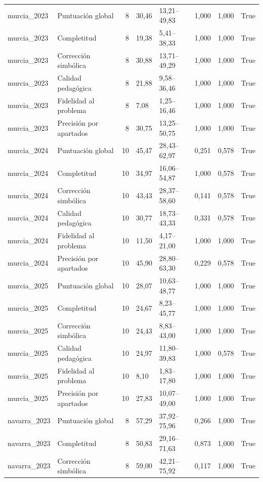 \begin{tabular}{llrllllr}
murcia\_2023 & Puntuación global & 8 & 30,46 & 13,21–49,83 & 1,000 & 1,000 & True \\
murcia\_2023 & Completitud & 8 & 19,38 & 5,41–38,33 & 1,000 & 1,000 & True \\
murcia\_2023 & Corrección simbólica & 8 & 30,88 & 13,71–49,29 & 1,000 & 1,000 & True \\
murcia\_2023 & Calidad pedagógica & 8 & 21,88 & 9,58–36,46 & 1,000 & 1,000 & True \\
murcia\_2023 & Fidelidad al problema & 8 & 7,08 & 1,25–16,46 & 1,000 & 1,000 & True \\
murcia\_2023 & Precisión por apartados & 8 & 30,75 & 13,25–50,75 & 1,000 & 1,000 & True \\
murcia\_2024 & Puntuación global & 10 & 45,47 & 28,43–62,97 & 0,251 & 0,578 & True \\
murcia\_2024 & Completitud & 10 & 34,97 & 16,06–54,87 & 1,000 & 0,578 & True \\
murcia\_2024 & Corrección simbólica & 10 & 43,43 & 28,37–58,60 & 0,141 & 0,578 & True \\
murcia\_2024 & Calidad pedagógica & 10 & 30,77 & 18,73–43,33 & 0,331 & 0,578 & True \\
murcia\_2024 & Fidelidad al problema & 10 & 11,50 & 4,17–21,00 & 1,000 & 1,000 & True \\
murcia\_2024 & Precisión por apartados & 10 & 45,90 & 28,80–63,30 & 0,229 & 0,578 & True \\
murcia\_2025 & Puntuación global & 10 & 28,07 & 10,63–48,77 & 1,000 & 1,000 & True \\
murcia\_2025 & Completitud & 10 & 24,67 & 8,23–45,77 & 1,000 & 1,000 & True \\
murcia\_2025 & Corrección simbólica & 10 & 24,43 & 8,83–43,00 & 1,000 & 1,000 & True \\
murcia\_2025 & Calidad pedagógica & 10 & 24,97 & 11,80–39,83 & 1,000 & 0,578 & True \\
murcia\_2025 & Fidelidad al problema & 10 & 8,10 & 1,83–17,80 & 1,000 & 1,000 & True \\
murcia\_2025 & Precisión por apartados & 10 & 27,83 & 10,07–49,00 & 1,000 & 1,000 & True \\
navarra\_2023 & Puntuación global & 8 & 57,29 & 37,92–75,96 & 0,266 & 1,000 & True \\
navarra\_2023 & Completitud & 8 & 50,83 & 29,16–71,63 & 0,873 & 1,000 & True \\
navarra\_2023 & Corrección simbólica & 8 & 59,00 & 42,21–75,92 & 0,117 & 1,000 & True \\

\end{tabular}
